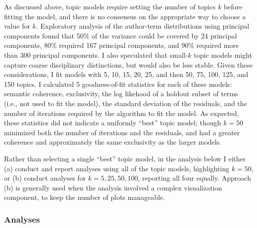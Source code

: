 \documentclass[
  11pt,
]{article}
\begin{document}
As discussed above, topic models require setting the number of topics \(k\) before fitting the model, and there is no consensus on the appropriate way to choose a value for \(k\). Exploratory analysis of the author-term distributions using principal components found that 50\% of the variance could be covered by 24 principal components, 80\% required 167 principal components, and 90\% required more than 300 principal components. I also speculated that small-\(k\) topic models might capture coarse disciplinary distinctions, but would also be less stable. Given these considerations, I fit models with 5, 10, 15, 20, 25, and then 50, 75, 100, 125, and 150 topics. I calculated 5 goodness-of-fit statistics for each of these models: semantic coherence, exclusivity, the log likehood of a holdout subset of terms (i.e., not used to fit the model), the standard deviation of the residuals, and the number of iterations required by the algorithm to fit the model. As expected, these statistics did not indicate a uniformly ``best'' topic model; though \(k=50\) minimized both the number of iterations and the residuals, and had a greater coherence and approximately the same exclusivity as the larger models.

Rather than selecting a single ``best'' topic model, in the analysis below I either (a) conduct and report analyses using all of the topic models, highlighting \(k=50\), or (b) conduct analyses for \(k = 5, 25, 50, 100\), reporting all four equally. Approach (b) is generally used when the analysis involved a complex visualization component, to keep the number of plots manageable.

\hypertarget{analyses}{%
\subsubsection{Analyses}\label{analyses}}
\end{document}
